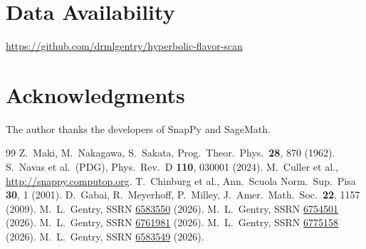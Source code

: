 \documentclass[11pt,a4paper]{article}
\theoremstyle{definition}
\begin{document}
\section*{Data Availability}
\url{https://github.com/drmlgentry/hyperbolic-flavor-scan}

\section*{Acknowledgments}
The author thanks the developers of SnapPy and SageMath.

\begin{thebibliography}{99}
Z.~Maki, M.~Nakagawa, S.~Sakata,
Prog.\ Theor.\ Phys.\ \textbf{28}, 870 (1962).
S.~Navas et al.\ (PDG), Phys.\ Rev.\ D \textbf{110}, 030001 (2024).
M.~Culler et al., \url{http://snappy.computop.org}.
T.~Chinburg et al.,
Ann.\ Scuola Norm.\ Sup.\ Pisa \textbf{30}, 1 (2001).
D.~Gabai, R.~Meyerhoff, P.~Milley,
J.\ Amer.\ Math.\ Soc.\ \textbf{22}, 1157 (2009).
M.~L.~Gentry, SSRN \href{https://doi.org/10.2139/ssrn.6583550}{6583550} (2026).
M.~L.~Gentry, SSRN \href{https://doi.org/10.2139/ssrn.6754501}{6754501} (2026).
M.~L.~Gentry, SSRN \href{https://doi.org/10.2139/ssrn.6761981}{6761981} (2026).
M.~L.~Gentry, SSRN \href{https://doi.org/10.2139/ssrn.6775158}{6775158} (2026).
M.~L.~Gentry, SSRN \href{https://doi.org/10.2139/ssrn.6583549}{6583549} (2026).
\end{thebibliography}
\end{document}
